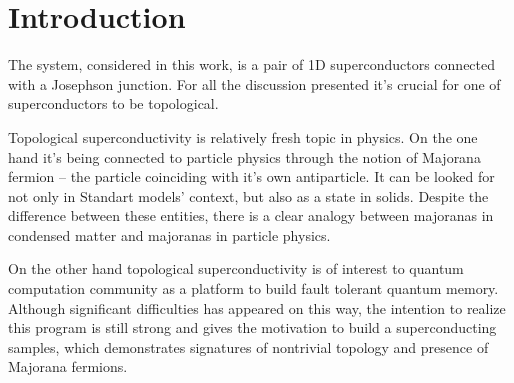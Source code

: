 \chapter{Introduction}


The system, considered in this work, is a pair of 1D superconductors connected with a Josephson junction. For all the discussion presented it's crucial for one of superconductors to be topological. 

Topological superconductivity is relatively fresh topic in physics. On the one hand it's being connected to particle physics through the notion of Majorana fermion -- the particle coinciding with it's own antiparticle\cite{Majorana_1937}. It can be looked for not only in Standart models' context\cite{particle_majorana_Avignone}\cite{particle_majorana_Giuliani}\cite{particle_majorana_Marcocci}, but also as a state in solids\cite{majorana_condmat_Rossi}\cite{majorana_condmat_Kitaev}\cite{majorana_condmat_Kopnin}\cite{majorana_condmat_Motrunich}\cite{majorana_condmat_Nayak}\cite{majorana_condmat_Read_Green}\cite{majorana_condmat_Senthil}\cite{majorana_condmat_Volovik}\cite{majorana_condmat_Fu_Kane}\cite{review_majorana_Aguado}\cite{review_majorana_Beenakker}\cite{review_majorana_Oppen}. Despite the difference between these entities, there is a clear analogy between majoranas in condensed matter and majoranas in particle physics\cite{Dirak_BdG_Chamon}\cite{Dirak_BdG_Elliott}.

 On the other hand topological superconductivity is of interest to quantum computation community as a platform to build fault tolerant quantum memory\cite{majorana_condmat_Kitaev}\cite{quintum_computation_Alicea}\cite{quintum_computation_Nayak}\cite{quintum_computation_Romito}. Although significant difficulties has appeared on this way, the intention to realize this program is still strong and gives the motivation to build a superconducting samples, which demonstrates signatures of nontrivial topology and presence of Majorana fermions\cite{majorana_experiment_Kouwenhoven}\cite{majorana_experiment_Vaitiekėnas}\cite{majorana_experiment_Zhang}.
 
